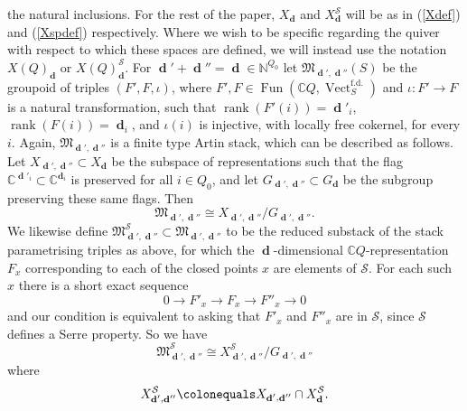 \documentclass[a4paper,10pt]{amsart}
\newcommand{\SP}{\mathcal{S}}
\newcommand{\Mst}{\mathfrak{M}}
\DeclareMathOperator{\rank}{rank}
\DeclareMathOperator{\fd}{f.d.}
\DeclareMathOperator{\Fun}{Fun}
\DeclareMathOperator{\Vect}{Vect}
\DeclareMathOperator{\dd}{\mathbf{d}}
\begin{document}
the natural inclusions.
\smallbreak
For the rest of the paper, $X_{\dd}$ and $X^{\SP}_{\dd}$ will be as in (\ref{Xdef}) and (\ref{Xspdef}) respectively.  Where we wish to be specific regarding the quiver with respect to which these spaces are defined, we will instead use the notation $X(Q)_{\dd}$ or $X(Q)^{\SP}_{\dd}$.
\smallbreak
For $\dd'+\dd''=\dd\in\mathbb{N}^{Q_0}$ let $\Mst_{\dd',\dd''}(S)$ be the groupoid of triples $(F',F,\iota)$, where $F',F\in\Fun(\mathbb{C}Q,\Vect_S^{\fd})$ and $\iota\colon F'\rightarrow F$ is a natural transformation, such that $\rank(F'(i))=\dd'_i$, $\rank(F(i))=\dd_i$, and $\iota(i)$ is injective, with locally free cokernel, for every $i$.  Again, $\Mst_{\dd',\dd''}$ is a finite type Artin stack, which can be described as follows.  Let $X_{\dd',\dd''}\subset X_{\dd}$ be the subspace of representations such that the flag $\mathbb{C}^{\dd'_i}\subset \mathbb{C}^{\dd_i}$ is preserved for all $i\in Q_0$, and let $G_{\dd',\dd''}\subset G_{\dd}$ be the subgroup preserving these same flags.  Then 
\[
\Mst_{\dd',\dd''}\cong X_{\dd',\dd''}/G_{\dd',\dd''}.
\]
\smallbreak
We likewise define $\Mst_{\dd',\dd''}^{\SP}\subset\Mst_{\dd',\dd''}$ to be the reduced substack of the stack parametrising triples as above, for which the $\dd$-dimensional $\mathbb{C} Q$-representation $F_x$ corresponding to each of the closed points $x$ are elements of $\mathcal{S}$.  For each such $x$ there is a short exact sequence
\[
0\rightarrow F'_x\rightarrow F_x\rightarrow F''_x\rightarrow 0
\]
and our condition is equivalent to asking that $F'_x$ and $F''_x$ are in $\mathcal{S}$, since $\mathcal{S}$ defines a Serre property.  So we have
\[
\Mst^{\SP}_{\dd',\dd''}\cong X^{\SP}_{\dd',\dd''}/G_{\dd',\dd''}
\]
where
\[
X^{\SP}_{\dd',\dd''}\colonequals X_{\dd',\dd''}\cap X^{\SP}_{\dd}.
\]
\end{document}
